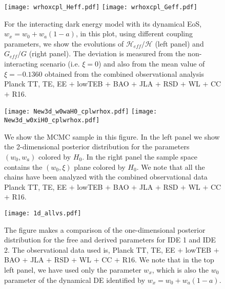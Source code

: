 \documentclass[superscriptaddress,oneolumn,secnumarabic,
amssymb,amsmath,nobibnotes,aps,prd,showpacs,nofootinbib]{revtex4}%
\begin{document}
	\begin{figure}%
		\texttt{[image: wrhoxcpl\_Heff.pdf]}
		\texttt{[image: wrhoxcpl\_Geff.pdf]}
		\caption{For the interacting dark energy model with its dynamical EoS, $w_x = w_0 + w_a(1 -a)$, in this plot, using different coupling parameters, we show the evolutions of $\mathcal{H}_{eff}/\mathcal{H}$ (left panel) and $G_{eff}/G$ (right panel). The deviation is measured from the non-interacting scenario (i.e. $\xi =0$) and also from the mean value of $\xi = -0.1360$ obtained from the combined observational analysis Planck TT, TE, EE $+$ lowTEB $+$ BAO $+$ JLA $+$ RSD $+$ WL $+$ CC $+$ R16.}
		\label{fig:new2-dynamical}
	\end{figure}

	\begin{figure}%
		\texttt{[image: New3d\_w0waH0\_cplwrhox.pdf]}
		\texttt{[image: New3d\_w0xiH0\_cplwrhox.pdf]}
		\caption{We show the MCMC sample in this figure. In the left panel we show the 2-dimensional posterior distribution for the parameters $(w_0, w_a)$ colored by $H_0$.  In the right panel the sample space contains the $(w_0, \xi)$ plane colored by $H_0$. We note that all the chains have been analyzed with the combined observational data Planck TT, TE, EE $+$ lowTEB $+$ BAO $+$ JLA $+$ RSD $+$ WL $+$ CC $+$ R16. }
		\label{fig:scatter2-IDE2}
	\end{figure}

	\begin{figure}%
		\texttt{[image: 1d\_allvs.pdf]}
		\caption{The figure makes a comparison of the one-dimensional posterior distribution for the free and derived parameters for IDE 1 and IDE 2. The observational data used is, Planck TT, TE, EE $+$ lowTEB $+$ BAO $+$ JLA $+$ RSD $+$ WL $+$ CC $+$ R16. We note that in the top left panel, we have used only the parameter $w_x$, which is also the  $w_0$ parameter of the dynamical DE identified by $w_x = w_0 + w_a (1-a)$.}
		\label{fig:posterior-comparison}
	\end{figure}
\end{document}
